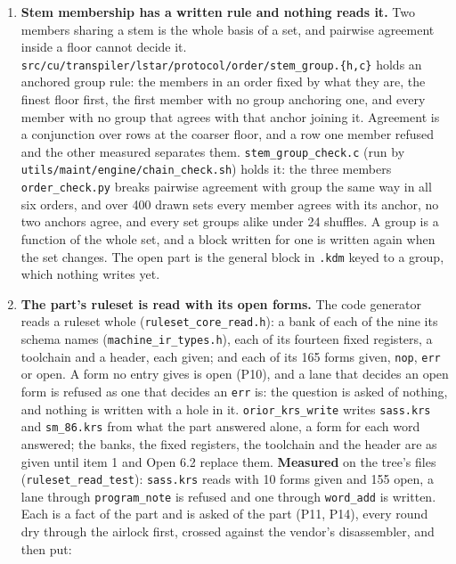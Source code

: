 \begin{enumerate}
\item \textbf{Stem membership has a written rule and nothing reads it.} Two members sharing a stem is the whole basis of a set, and pairwise agreement inside a floor cannot decide it. \texttt{src/\allowbreak{}cu/\allowbreak{}transpiler/\allowbreak{}lstar/\allowbreak{}protocol/\allowbreak{}order/\allowbreak{}stem\_\allowbreak{}group.\allowbreak{}\{h,c\}} holds an anchored group rule: the members in an order fixed by what they are, the finest floor first, the first member with no group anchoring one, and every member with no group that agrees with that anchor joining it. Agreement is a conjunction over rows at the coarser floor, and a row one member refused and the other measured separates them. \texttt{stem\_\allowbreak{}group\_\allowbreak{}check.\allowbreak{}c} (run by \texttt{utils/\allowbreak{}maint/\allowbreak{}engine/\allowbreak{}chain\_\allowbreak{}check.\allowbreak{}sh}) holds it: the three members \texttt{order\_\allowbreak{}check.\allowbreak{}py} breaks pairwise agreement with group the same way in all six orders, and over 400 drawn sets every member agrees with its anchor, no two anchors agree, and every set groups alike under 24 shuffles. A group is a function of the whole set, and a block written for one is written again when the set changes. The open part is the general block in \texttt{.\allowbreak{}kdm} keyed to a group, which nothing writes yet.
\item \textbf{The part's ruleset is read with its open forms.} The code generator reads a ruleset whole (\texttt{ruleset\_\allowbreak{}core\_\allowbreak{}read.\allowbreak{}h}): a bank of each of the nine its schema names (\texttt{machine\_\allowbreak{}ir\_\allowbreak{}types.\allowbreak{}h}), each of its fourteen fixed registers, a toolchain and a header, each given; and each of its 165 forms given, \texttt{nop}, \texttt{err} or open. A form no entry gives is open (P10), and a lane that decides an open form is refused as one that decides an \texttt{err} is: the question is asked of nothing, and nothing is written with a hole in it. \texttt{orior\_\allowbreak{}krs\_\allowbreak{}write} writes \texttt{sass.\allowbreak{}krs} and \texttt{sm\_\allowbreak{}86.\allowbreak{}krs} from what the part answered alone, a form for each word answered; the banks, the fixed registers, the toolchain and the header are as given until item 1 and Open 6.2 replace them. \textbf{Measured} on the tree's files (\texttt{ruleset\_\allowbreak{}read\_\allowbreak{}test}): \texttt{sass.\allowbreak{}krs} reads with 10 forms given and 155 open, a lane through \texttt{program\_\allowbreak{}note} is refused and one through \texttt{word\_\allowbreak{}add} is written. Each is a fact of the part and is asked of the part (P11, P14), every round dry through the airlock first, crossed against the vendor's disassembler, and then put:


\end{enumerate}
